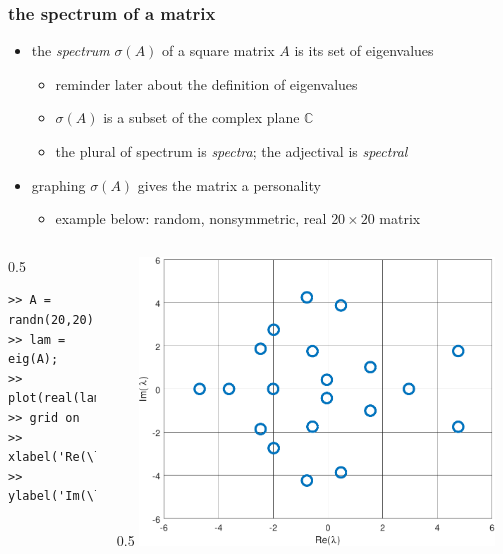 \documentclass[10pt,hyperref]{beamer}
\newcommand{\CC}{\mathbb{C}}
\begin{document}
\begin{frame}[fragile]
\frametitle{the spectrum of a matrix}

\begin{itemize}
\item the \emph{spectrum} $\sigma(A)$ of a square matrix $A$ is its set of eigenvalues
    \begin{itemize}
    \item[$\circ$] reminder later about the definition of eigenvalues
    \item[$\circ$] $\sigma(A)$ is a subset of the complex plane $\CC$
    \item[$\circ$] the plural of spectrum is \emph{spectra}; the adjectival is \emph{spectral}
    \end{itemize}
\item graphing $\sigma(A)$ gives the matrix a personality
    \begin{itemize}
    \item[$\circ$] example below: random, nonsymmetric, real $20\times 20$ matrix
    \end{itemize}
\end{itemize}

\bigskip
\begin{columns}
\begin{column}{0.5\textwidth}
\begin{Verbatim}[fontsize=\scriptsize]
>> A = randn(20,20);
>> lam = eig(A);
>> plot(real(lam),imag(lam),'o')
>> grid on
>> xlabel('Re(\lambda)')
>> ylabel('Im(\lambda)')
\end{Verbatim}
\end{column}
\begin{column}{0.5\textwidth}
\includegraphics[width=0.9\textwidth]{figs/randspectrum}
\end{column}
\end{columns}
\end{frame}
\end{document}
